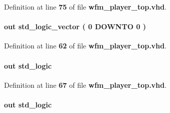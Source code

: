 Definition at line {\bf 75} of file {\bf wfm\+\_\+player\+\_\+top.\+vhd}.

\paragraph[{mem\+\_\+odt}]{ {\bfseries \textcolor{keywordflow}{out}\textcolor{vhdlchar}{ }} {\bfseries \textcolor{comment}{std\+\_\+logic\+\_\+vector}\textcolor{vhdlchar}{ }\textcolor{vhdlchar}{(}\textcolor{vhdlchar}{ }\textcolor{vhdlchar}{ } \textcolor{vhdldigit}{0} \textcolor{vhdlchar}{ }\textcolor{keywordflow}{D\+O\+W\+N\+TO}\textcolor{vhdlchar}{ }\textcolor{vhdlchar}{ } \textcolor{vhdldigit}{0} \textcolor{vhdlchar}{ }\textcolor{vhdlchar}{)}\textcolor{vhdlchar}{ }} \hspace{0.3cm}{\ttfamily [Port]}}\label{classwfm__player__top_a121dba4ade7d2721655a32b9032be8a1}


Definition at line {\bf 62} of file {\bf wfm\+\_\+player\+\_\+top.\+vhd}.

\paragraph[{mem\+\_\+ras\+\_\+n}]{ {\bfseries \textcolor{keywordflow}{out}\textcolor{vhdlchar}{ }} {\bfseries \textcolor{comment}{std\+\_\+logic}\textcolor{vhdlchar}{ }} \hspace{0.3cm}{\ttfamily [Port]}}\label{classwfm__player__top_a893ace9b632d35310a7cf5e2f1b3a1c3}


Definition at line {\bf 67} of file {\bf wfm\+\_\+player\+\_\+top.\+vhd}.

\paragraph[{mem\+\_\+we\+\_\+n}]{ {\bfseries \textcolor{keywordflow}{out}\textcolor{vhdlchar}{ }} {\bfseries \textcolor{comment}{std\+\_\+logic}\textcolor{vhdlchar}{ }} \hspace{0.3cm}{\ttfamily [Port]}}\label{classwfm__player__top_a3aabbfab3ba48c3d77176a1c7caf2bce}


